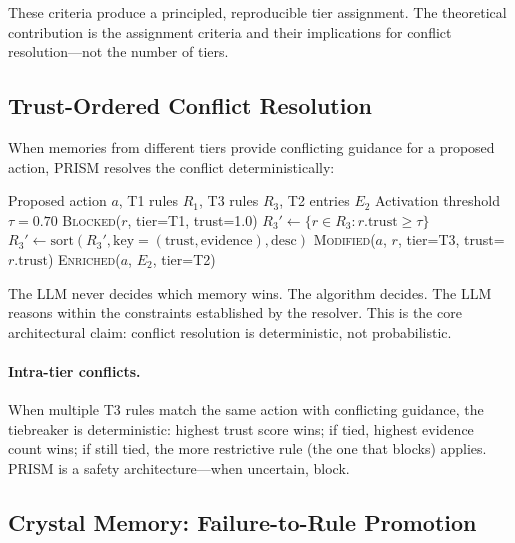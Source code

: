 \documentclass[11pt]{article}
\begin{document}
\noindent These criteria produce a principled, reproducible tier assignment.
The theoretical contribution is the assignment criteria and their
implications for conflict resolution---not the number of tiers.

\subsection{Trust-Ordered Conflict Resolution}

When memories from different tiers provide conflicting guidance
for a proposed action, PRISM resolves the conflict deterministically:

\begin{algorithm}[h]
\caption{Deterministic Conflict Resolution}
\label{alg:resolver}
\begin{algorithmic}[1]
\Require Proposed action $a$, T1 rules $R_1$, T3 rules $R_3$, T2 entries $E_2$
\Require Activation threshold $\tau = 0.70$
 
        \State \Return \textsc{Blocked}($r$, tier=T1, trust=1.0)
    \EndIf
\EndFor
\State $R_3' \gets \{r \in R_3 : r.\text{trust} \geq \tau\}$ 
\State $R_3' \gets \text{sort}(R_3', \text{key}=(\text{trust}, \text{evidence}), \text{desc})$
 
        \State \Return \textsc{Modified}($a$, $r$, tier=T3, trust=$r.\text{trust}$)
    \EndIf
\EndFor
\State \Return \textsc{Enriched}($a$, $E_2$, tier=T2) 
\end{algorithmic}
\end{algorithm}

\noindent The LLM never decides which memory wins. The algorithm decides.
The LLM reasons within the constraints established by the resolver.
This is the core architectural claim:
conflict resolution is deterministic, not probabilistic.

\paragraph{Intra-tier conflicts.}
When multiple T3 rules match the same action with conflicting guidance,
the tiebreaker is deterministic: highest trust score wins;
if tied, highest evidence count wins; if still tied, the more restrictive rule
(the one that blocks) applies. PRISM is a safety architecture---when uncertain, block.

\subsection{Crystal Memory: Failure-to-Rule Promotion}
\end{document}
